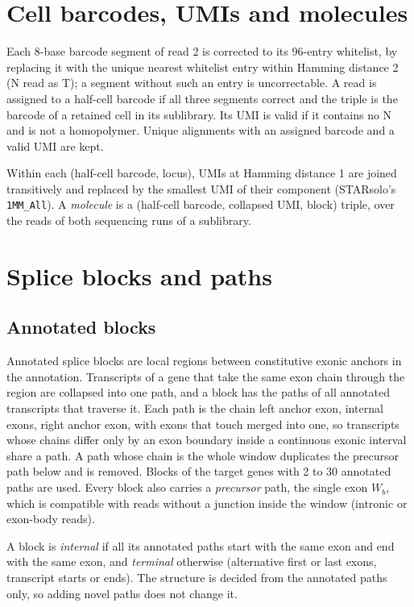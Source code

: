 \documentclass[11pt]{article}
\begin{document}
\section{Cell barcodes, UMIs and molecules}

Each 8-base barcode segment of read 2 is corrected to its 96-entry whitelist, by replacing it with the unique nearest whitelist entry within Hamming distance 2 (N read as T); a segment without such an entry is uncorrectable. A read is assigned to a half-cell barcode if all three segments correct and the triple is the barcode of a retained cell in its sublibrary. Its UMI is valid if it contains no N and is not a homopolymer. Unique alignments with an assigned barcode and a valid UMI are kept.

Within each (half-cell barcode, locus), UMIs at Hamming distance 1 are joined transitively and replaced by the smallest UMI of their component (STARsolo's \texttt{1MM\_All}). A \emph{molecule} is a (half-cell barcode, collapsed UMI, block) triple, over the reads of both sequencing runs of a sublibrary.

\section{Splice blocks and paths}

\subsection{Annotated blocks}
\label{sec:blocks}

Annotated splice blocks are local regions between constitutive exonic anchors in the annotation. Transcripts of a gene that take the same exon chain through the region are collapsed into one path, and a block has the paths of all annotated transcripts that traverse it. Each path is the chain left anchor exon, internal exons, right anchor exon, with exons that touch merged into one, so transcripts whose chains differ only by an exon boundary inside a continuous exonic interval share a path. A path whose chain is the whole window duplicates the precursor path below and is removed. Blocks of the target genes with 2 to 30 annotated paths are used. Every block also carries a \emph{precursor} path, the single exon $W_b$, which is compatible with reads without a junction inside the window (intronic or exon-body reads).

A block is \emph{internal} if all its annotated paths start with the same exon and end with the same exon, and \emph{terminal} otherwise (alternative first or last exons, transcript starts or ends). The structure is decided from the annotated paths only, so adding novel paths does not change it.
\end{document}
